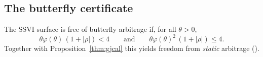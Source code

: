 \subsection{The butterfly certificate}

\begin{proposition}\label{thm:gjbfly}
The SSVI surface is free of butterfly arbitrage if, for all $\theta>0$,
\begin{equation}\label{eq:gjconds}
\theta\varphi(\theta)\,(1+|\rho|)<4
\qquad\text{and}\qquad
\theta\varphi(\theta)^{2}\,(1+|\rho|)\le4 .
\end{equation}
Together with Proposition~\ref{thm:gjcal} this yields freedom from \emph{static} arbitrage
(\cite[Cor.~4.1]{gatheraljacquier2014}).
\end{proposition}

